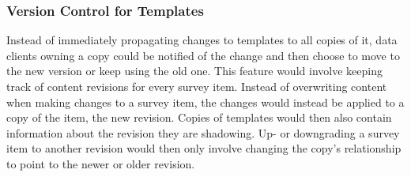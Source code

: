		\subsubsection{Version Control for Templates}
			Instead of immediately propagating changes to templates
			to all copies of it, data clients owning a copy
			could be notified of the change and then choose to
			move to the new version or keep using the old one.
			This feature would involve keeping track of
			content revisions for every survey item.
			Instead of overwriting content when making changes
			to a survey item, the changes would instead be
			applied to a copy of the item, the new revision.
			Copies of templates would then also contain information
			about the revision they are shadowing. 
			Up- or downgrading a survey item to another revision
			would then only involve changing the copy's
			 relationship to point to the newer
			or older revision.